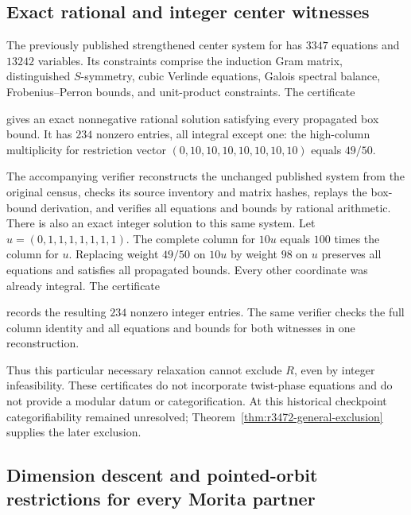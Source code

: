 \subsection{Exact rational and integer center witnesses}
\label{subsec:r3472-focus-rational-center}

The previously published strengthened center system for
 has $3347$ equations and $13242$ variables. Its
constraints comprise the induction Gram matrix, distinguished
$S$-symmetry, cubic Verlinde equations, Galois spectral balance,
Frobenius--Perron bounds, and unit-product constraints. The certificate
\begin{quote}\small
{}
\end{quote}
gives an exact nonnegative rational solution satisfying every propagated
box bound. It has $234$ nonzero entries, all integral except one:
the high-column multiplicity for restriction vector
$(0,10,10,10,10,10,10,10)$ equals $49/50$.

The accompanying verifier reconstructs the unchanged published system
from the original census, checks its source inventory and matrix hashes,
replays the box-bound derivation, and verifies all equations and bounds
by rational arithmetic. There is also an exact integer solution to this same system. Let
$u=(0,1,1,1,1,1,1,1)$. The complete column for $10u$ equals $100$ times
the column for $u$. Replacing weight $49/50$ on $10u$ by weight $98$
on $u$ preserves all equations and satisfies all propagated bounds.
Every other coordinate was already integral. The certificate
\begin{quote}\small
{}
\end{quote}
records the resulting $234$ nonzero integer entries. The same verifier
checks the full column identity and all equations and bounds for both
witnesses in one reconstruction.

Thus this particular necessary relaxation cannot exclude $R$, even by
integer infeasibility. These certificates do not incorporate twist-phase
equations and do not provide a modular datum or categorification.
At this historical checkpoint categorifiability remained unresolved;
Theorem~\ref{thm:r3472-general-exclusion} supplies the later exclusion.


\subsection{Dimension descent and pointed-orbit restrictions for every Morita partner}
\label{subsec:focus3472-morita}

